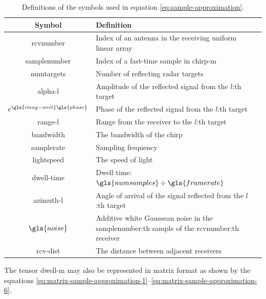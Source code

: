 \begin{table}[]
    \centering
    \begin{tabular}{c l l}
    \toprule
        \textbf{Symbol} & \textbf{Definition} \\
    \midrule
        \gls{rcvnumber} & Index of an antenna in the receiving uniform linear array \\
        \gls{samplenumber} & Index of a fast-time sample in \gls{chirp-m}\\
        \gls{numtargets} & Number of reflecting radar targets \\
        \gls{alpha-l} & Amplitude of the reflected signal from the $l$:th target \\
        $e^{\gls{imag-unit} \gls{phase}}$ & Phase of the reflected signal from the $l$:th target\\
        \gls{range-l} & Range from the receiver to the $l$:th target \\
        \gls{bandwidth} & The bandwidth of the chirp \\
        \gls{samplerate} & Sampling frequency \\
        \gls{lightspeed} & The speed of light \\
        \gls{dwell-time} & Dwell time: $\gls{numsamples} \div \gls{framerate}$\\
        \gls{azimuth-l} & Angle of arrival of the signal reflected from the $l$:th target \\
        $\gls{noise}$ & Additive white Gaussean noise in the \gls{samplenumber}:th sample of the \gls{rcvnumber}:th receiver \\
        \gls{rcv-dist} & The distance between adjacent receivers \\
    \bottomrule
    \end{tabular}
    \caption{Definitions of the symbols used in equation \ref{eq:sample-approximation}.}
    \label{tab:sample-approximation-variables}
\end{table}

The tensor \gls{dwell-m} may also be represented in matrix format as shown by the equations 
\ref{eq:matrix-sample-approximation-1}--\ref{eq:matrix-sample-approximation-6}.

